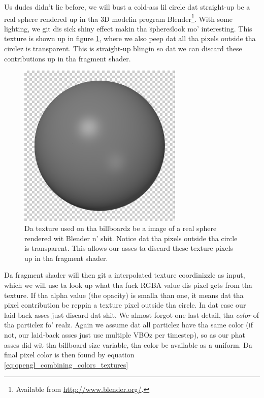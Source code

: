 Us dudes didn't lie before, we will bust a cold-ass lil circle dat straight-up be a real sphere rendered up in tha 3D modelin program Blender\footnote{Available from \url{http://www.blender.org/}.}. With some lighting, we git dis sick shiny effect makin tha \"spheres\" look mo' interesting. This texture is shown up in figure \ref{fig:visualization_billboard_texture}, where we also peep dat all tha pixels outside tha circlez is transparent. This is straight-up blingin so dat we can discard these contributions up in tha fragment shader.
\begin{figure}[h]
\begin{center}
\includegraphics[width=0.7\textwidth, trim=0cm 0cm 0cm 0cm, clip]{visualization/figures/texture_transparent.png}
\end{center}
\caption{Da texture used on tha billboardz be a image of a real sphere rendered wit Blender n' shit. Notice dat tha pixels outside tha circle is transparent. This allows our asses ta discard these texture pixels up in tha fragment shader.}
\label{fig:visualization_billboard_texture}
\end{figure}
Da fragment shader will then git a interpolated texture coordinizzle as input, which we will use ta look up what tha fuck RGBA value dis pixel gets from tha texture. If tha alpha value (the opacity) is smalla than one, it means dat tha pixel contribution be reppin a texture pixel outside tha circle. In dat case our laid-back asses just discard dat shit. We almost forgot one last detail, tha \textit{color} of tha particlez fo' realz. Again we assume dat all particlez have tha same color (if not, our laid-back asses just use multiple VBOz per timestep), so as our phat asses did wit tha billboard size variable, tha color be available as a uniform. Da final pixel color is then found by equation \eqref{eq:opengl_combining_colors_textures}
